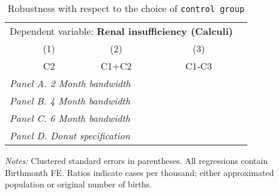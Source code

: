  \begin{table}[H] \begin{threeparttable} \centering \caption{Robustness with respect to the choice of \texttt{control group}} {\def\sym#1{\ifmmode^{#1}\else\(^{#1}\)\fi} \begin{tabular}{l*{4}{c}} \toprule \multicolumn{4}{c}{Dependent variable: \textbf{Renal insufficiency (Calculi)}} \\ \cmidrule(lr){2-4}
            &\multicolumn{1}{c}{(1)}&\multicolumn{1}{c}{(2)}&\multicolumn{1}{c}{(3)}\\
            &\multicolumn{1}{c}{C2}&\multicolumn{1}{c}{C1+C2}&\multicolumn{1}{c}{C1-C3}\\
\midrule
 \multicolumn{4}{l}{\emph{Panel A. 2 Month bandwidth}} \\    \midrule\multicolumn{4}{l}{\emph{Panel B. 4 Month bandwidth}} \\    \midrule\multicolumn{4}{l}{\emph{Panel C. 6 Month bandwidth}} \\    \midrule\multicolumn{4}{l}{\emph{Panel D. Donut specification}} \\    
\bottomrule \end{tabular} } \begin{tablenotes} \item \scriptsize \emph{Notes:} Clustered standard errors in parentheses. All regressions contain Birthmonth FE. Ratios indicate cases per thousand; either approximated population or original number of births. \end{tablenotes} \end{threeparttable} \end{table} 
